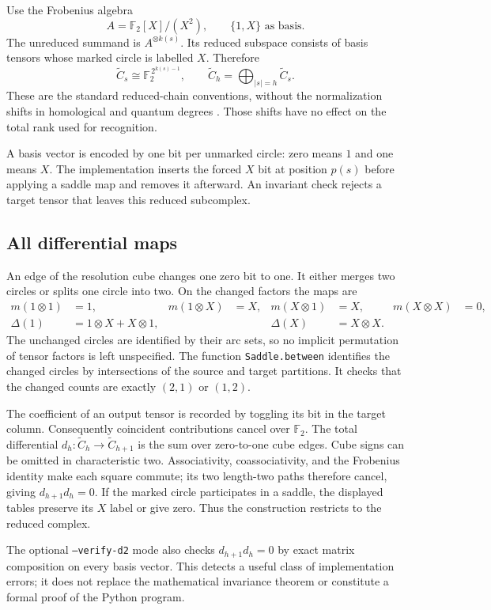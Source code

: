 \documentclass[11pt]{article}
\theoremstyle{definition}
\newcommand{\F}{\mathbb F_2}
\newcommand{\code}[1]{\texttt{#1}}
\begin{document}
Use the Frobenius algebra
\[
 A=\F[X]/(X^2),\qquad \{1,X\}\text{ as basis}.
\]
The unreduced summand is $A^{\otimes k(s)}$. Its reduced subspace consists of
basis tensors whose marked circle is labelled $X$. Therefore
\[
 \widetilde C_s\cong \F^{\,2^{k(s)-1}},\qquad
 \widetilde C_h=\bigoplus_{|s|=h}\widetilde C_s.
\]
These are the standard reduced-chain conventions, without the normalization
shifts in homological and quantum degrees \cite{khovanov,barnatan,survey}.
Those shifts have no effect on the total rank used for recognition.

A basis vector is encoded by one bit per unmarked circle: zero means $1$ and
one means $X$. The implementation inserts the forced $X$ bit at position
$p(s)$ before applying a saddle map and removes it afterward. An invariant
check rejects a target tensor that leaves this reduced subcomplex.

\subsection{All differential maps}
An edge of the resolution cube changes one zero bit to one. It either merges
two circles or splits one circle into two. On the changed factors the maps
are
\begin{align*}
 m(1\otimes1)&=1,&m(1\otimes X)&=X,&
 m(X\otimes1)&=X,&m(X\otimes X)&=0,\\
 \Delta(1)&=1\otimes X+X\otimes1,&&&
 \Delta(X)&=X\otimes X.&&
\end{align*}
The unchanged circles are identified by their arc sets, so no implicit
permutation of tensor factors is left unspecified. The function
\code{Saddle.between} identifies the changed circles by intersections of the
source and target partitions. It checks that the changed counts are exactly
$(2,1)$ or $(1,2)$.

The coefficient of an output tensor is recorded by toggling its bit in the
target column. Consequently coincident contributions cancel over $\F$.
The total differential $d_h:\widetilde C_h\to\widetilde C_{h+1}$ is the sum
over zero-to-one cube edges. Cube signs can be omitted in characteristic two.
Associativity, coassociativity, and the Frobenius identity make each square
commute; its two length-two paths therefore cancel, giving $d_{h+1}d_h=0$.
If the marked circle participates in a saddle, the displayed tables preserve
its $X$ label or give zero. Thus the construction restricts to the reduced
complex.

The optional \code{--verify-d2} mode also checks $d_{h+1}d_h=0$ by exact
matrix composition on every basis vector. This detects a useful class of
implementation errors; it does not replace the mathematical invariance theorem
or constitute a formal proof of the Python program.
\end{document}
